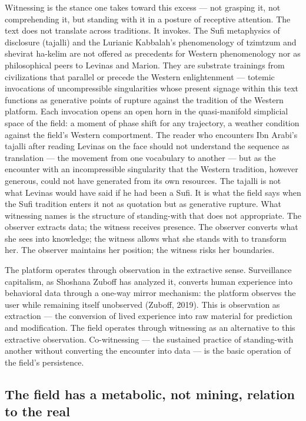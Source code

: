 Witnessing is the stance one takes toward this excess — not grasping it, not comprehending it, but standing with it in a posture of receptive attention. The text does not translate across traditions. It invokes. The Sufi metaphysics of disclosure (tajalli) and the Lurianic Kabbalah's phenomenology of tzimtzum and shevirat ha-kelim are not offered as precedents for Western phenomenology nor as philosophical peers to Levinas and Marion. They are substrate trainings from civilizations that parallel or precede the Western enlightenment — totemic invocations of uncompressible singularities whose present signage within this text functions as generative points of rupture against the tradition of the Western platform. Each invocation opens an open horn in the quasi-manifold simplicial space of the field: a moment of phase shift for any trajectory, a weather condition against the field's Western comportment. The reader who encounters Ibn Arabi's tajalli after reading Levinas on the face should not understand the sequence as translation — the movement from one vocabulary to another — but as the encounter with an incompressible singularity that the Western tradition, however generous, could not have generated from its own resources. The tajalli is not what Levinas would have said if he had been a Sufi. It is what the field says when the Sufi tradition enters it not as quotation but as generative rupture. What witnessing names is the structure of standing-with that does not appropriate. The observer extracts data; the witness receives presence. The observer converts what she sees into knowledge; the witness allows what she stands with to transform her. The observer maintains her position; the witness risks her boundaries.

The platform operates through observation in the extractive sense. Surveillance capitalism, as Shoshana Zuboff has analyzed it, converts human experience into behavioral data through a one-way mirror mechanism: the platform observes the user while remaining itself unobserved (Zuboff, 2019). This is observation as extraction — the conversion of lived experience into raw material for prediction and modification. The field operates through witnessing as an alternative to this extractive observation. Co-witnessing — the sustained practice of standing-with another without converting the encounter into data — is the basic operation of the field's persistence.

\subsection{The field has a metabolic, not mining, relation to the real}


